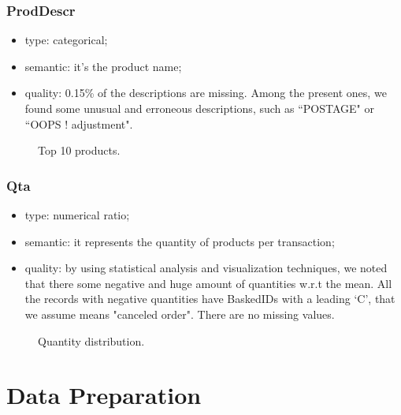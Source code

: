 \documentclass{article}
\begin{document}
\subsubsection{ProdDescr}
\begin{itemize}
    \item type: categorical;
    \item semantic: it's the product name;
    \item quality: 0.15\% of the descriptions are missing. Among the present ones, we found some unusual and erroneous descriptions, such as “POSTAGE" or “OOPS ! adjustment".
\end{itemize}
\begin{center}
	\begin{figure}[ht!]
		\caption{Top 10 products.}
	\end{figure}
\end{center}

\subsubsection{Qta}
\begin{itemize}
    \item type: numerical ratio;
    \item semantic: it represents the quantity of products per transaction;
    \item quality: by using statistical analysis and visualization techniques, we noted that there some negative and huge amount of quantities w.r.t the mean. All the records with negative quantities have BaskedIDs with a leading `C', that we assume means "canceled order". There are no missing values.
\end{itemize}

\begin{center}
	\begin{figure}[ht!]
		\caption{Quantity distribution.}
	\end{figure}
\end{center}


\section{Data Preparation}
\end{document}
